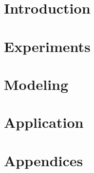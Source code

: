 \documentclass[11pt, openright, titlepage, table, twoside]{book}
\begin{document}
\maketitle




\part{Introduction}
\label{part:introduction}





\part{Experiments}
\label{part:experiments}





\part{Modeling}
\label{part:modeling}




\part{Application}
\label{part:application}







\newrefcontext[sorting=nyt] %
\printbibliography[heading=bibintoc, title={Bibliography}]


\appendix

\renewcommand{\thesection}{\Roman{section}} 
\renewcommand{\thesubsection}{\thesection.\Roman{subsection}}

\part{Appendices}
\label{part:appendices}





\end{document}
